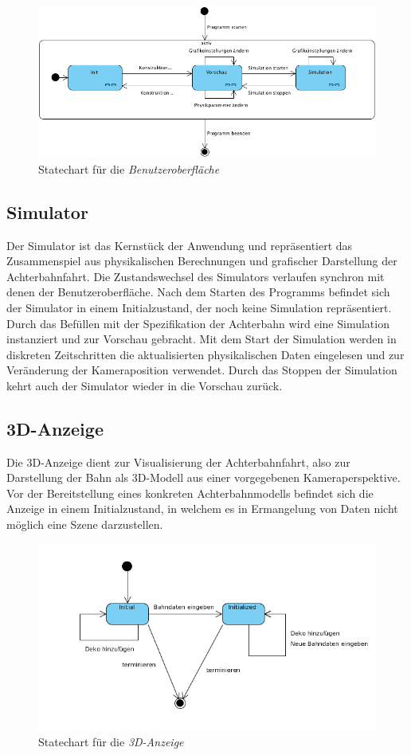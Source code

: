 \begin{figure}
\includegraphics[width=\linewidth]{bilder/StateChart_GUI}
\caption{Statechart für die \textit{Benutzeroberfläche}}
\end{figure}

\subsection{Simulator}
Der Simulator ist das Kernstück der Anwendung und repräsentiert das Zusammenspiel aus physikalischen Berechnungen
und grafischer Darstellung der Achterbahnfahrt. Die Zustandswechsel des Simulators verlaufen synchron mit 
denen der Benutzeroberfläche. Nach dem Starten des Programms befindet sich der Simulator in einem Initialzustand,
der noch keine Simulation repräsentiert. Durch das Befüllen mit der Spezifikation der Achterbahn wird
eine Simulation instanziert und zur Vorschau gebracht. Mit dem Start der Simulation werden in diskreten Zeitschritten
die aktualisierten physikalischen Daten eingelesen und zur Veränderung der Kameraposition verwendet. Durch das
Stoppen der Simulation kehrt auch der Simulator wieder in die Vorschau zurück.

\subsection{3D-Anzeige}
Die 3D-Anzeige dient zur Visualisierung der Achterbahnfahrt, also zur Darstellung der Bahn als 3D-Modell aus
einer vorgegebenen Kameraperspektive. Vor der Bereitstellung eines konkreten Achterbahnmodells befindet sich
die Anzeige in einem Initialzustand, in welchem es in Ermangelung von Daten nicht möglich eine Szene darzustellen. 

\begin{figure}
\includegraphics[width=\linewidth]{bilder/statechart_3dgraphics}
\caption{Statechart für die \textit{3D-Anzeige}}
\end{figure}

